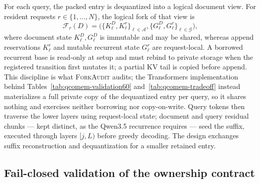 \documentclass{article}
\newcommand{\method}{\textsc{ForkAudit}}
\begin{document}
For each query, the packed entry is dequantized into a logical document view.
For resident requests \(r\in\{1,\ldots,N\}\), the logical fork of that view is
\begin{equation}
  \mathcal{F}_r(D)=
  \bigl(\{K^D_\ell,K^r_\ell\}_{\ell\in\mathcal A},
        \{G^D_\ell,G^r_\ell\}_{\ell\in\mathcal G}\bigr),
\end{equation}
where document state \(K^D_\ell,G^D_\ell\) is immutable and may be shared,
whereas append reservations \(K^r_\ell\) and mutable recurrent state
\(G^r_\ell\) are request-local.  A borrowed recurrent base is read-only at
setup and must rebind to private storage when the registered transition first
mutates it; a partial KV tail is copied before append.  This discipline is what
\method{} audits; the Transformers implementation behind
Tables~\ref{tab:qcomem-validation60} and~\ref{tab:qcomem-tradeoff} instead
materializes a full private copy of the dequantized entry per query, so it
shares nothing and exercises neither borrowing nor copy-on-write.  Query tokens then traverse the lower layers using request-local state; document
and query residual chunks --- kept distinct, as the Qwen3.5 recurrence requires
--- seed the suffix, executed through layers $[j,L)$ before greedy decoding.
The design exchanges suffix reconstruction and dequantization for a smaller
retained entry.

\subsection{Fail-closed validation of the ownership contract}
\label{sec:contract}
\end{document}
